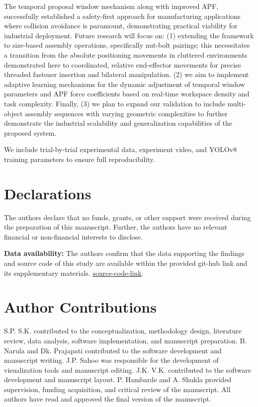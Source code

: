 \documentclass[pdflatex,sn-mathphys-num]{sn-jnl}%
\theoremstyle{thmstyleone}%
\theoremstyle{thmstylethree}%
\begin{document}
The temporal proposal window mechanism along with improved APF, successfully established a safety-first approach for manufacturing applications where collision avoidance is paramount, demonstrating practical viability for industrial deployment. Future research will focus on: (1) extending the framework to size-based assembly operations, specifically nut-bolt pairings; this necessitates a transition from the absolute positioning movements in cluttered environments demonstrated here to coordinated, relative end-effector movements for precise threaded fastener insertion and bilateral manipulation. (2) we aim to implement adaptive learning mechanisms for the dynamic adjustment of temporal window parameters and APF force coefficients based on real-time workspace density and task complexity. Finally, (3) we plan to expand our validation to include multi-object assembly sequences with varying geometric complexities to further demonstrate the industrial scalability and generalization capabilities of the proposed system.
\backmatter

We include trial-by-trial experimental data, experiment video, and YOLOv8 training parameters to ensure full reproducibility.
\section*{Declarations}
The authors declare that no funds, grants, or other support were received during the preparation of this manuscript. Further, the authors have no relevant financial or non-financial interests to disclose.

\textbf{Data availability:} The authors confirm that the data supporting the findings and source code of this study are available within the provided git-hub link and its supplementary materials. \href{https://github.com/suryaroboticarm/Dual-Arm-Motion-Planning}{source-code-link}. 

\section*{Author Contributions}
S.P. S.K. contributed to the conceptualization, methodology design, literature review, data analysis, software implementation, and manuscript preparation. B. Narula and Dk. Prajapati contributed to the software development and manuscript writing. J.P. Sahoo was responsible for the development of visualization tools and manuscript editing. J.K. V.K. contributed to the software development and manuscript layout. P. Hambarde and A. Shukla provided supervision, funding acquisition, and critical review of the manuscript. All authors have read and approved the final version of the manuscript.
% 

\end{document}
